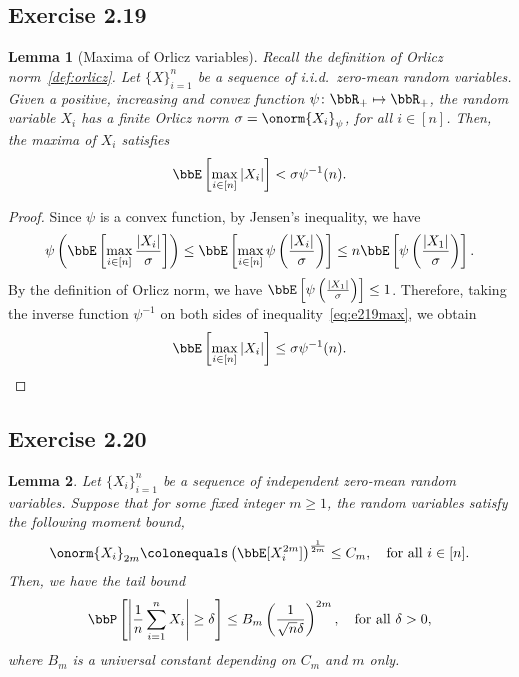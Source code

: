 \documentclass[11pt]{article}
\newcommand{\of}[1]{\left(#1\right)}
\newcommand{\off}[1]{\left[#1\right]}
\newcommand{\aabs}[1]{\left|#1\right|}
\theoremstyle{plain}
\newtheorem{lem}{Lemma}
\theoremstyle{definition}
\begin{document}
\subsection{Exercise 2.19}
\begin{lem}[Maxima of Orlicz variables] Recall the definition of Orlicz norm~\ref{def:orlicz}. Let $\{X\}_{i=1}^n$ be a sequence of i.i.d.\ zero-mean random variables. Given a positive, increasing and convex function $\psi \colon \bbR_+ \mapsto \bbR_+$, the random variable $X_i$ has a finite Orlicz norm $\sigma = \onorm{X_i}_{\psi}$, for all $i \in [n]$. Then, the maxima of $X_i$ satisfies
\begin{equation}
	\bbE \off{ \max_{i\in[n]} |X_i| } < \sigma \psi^{-1}(n).
\end{equation}
	
\end{lem}

\begin{proof}
	Since $\psi$ is a convex function, by Jensen's inequality, we have
	\begin{equation}\label{eq:e219max}
		\psi \of{\bbE \off{\max_{i \in [n]} \frac{|X_i|}{\sigma}  } } \leq \bbE \off{ \max_{i\in[n]} \psi \of{\frac{|X_i|}{\sigma}}   } \leq n \bbE \off{ \psi \of{\frac{|X_1|}{\sigma}} }.
	\end{equation}
	By the definition of Orlicz norm, we have $\bbE \off{ \psi \of{\frac{|X_1|}{\sigma}} } \leq 1$. Therefore, taking the inverse function $\psi^{-1}$ on both sides of inequality~\eqref{eq:e219max}, we obtain
	\[  \bbE \off{\max_{i \in [n]} {|X_i|} } \leq \sigma \psi^{-1}(n).  \]
\end{proof}
    
\subsection{Exercise 2.20}

\begin{lem}
	Let $\{X_i\}_{i=1}^n$ be a sequence of independent zero-mean random variables. Suppose that for some fixed integer $m \geq 1$, the random variables satisfy the following moment bound,
\begin{equation}\label{eq:e220mom}
	\onorm{X_i}_{2m} \colonequals \of{\bbE[X^{2m}_i] }^{\frac{1}{2m}} \leq C_m, \quad \text{for all } i \in [n].
\end{equation}
Then, we have the tail bound
\begin{equation}
	\bbP \off{\aabs{ \frac{1}{n}  \sum_{i=1}^n X_i } \geq \delta } \leq B_m \of{\frac{1}{\sqrt{n} \delta}}^{2m}, \quad \text{for all } \delta >0,
\end{equation}
where $B_m$ is a universal constant depending on $C_m$ and $m$ only.
\end{lem}
\end{document}
